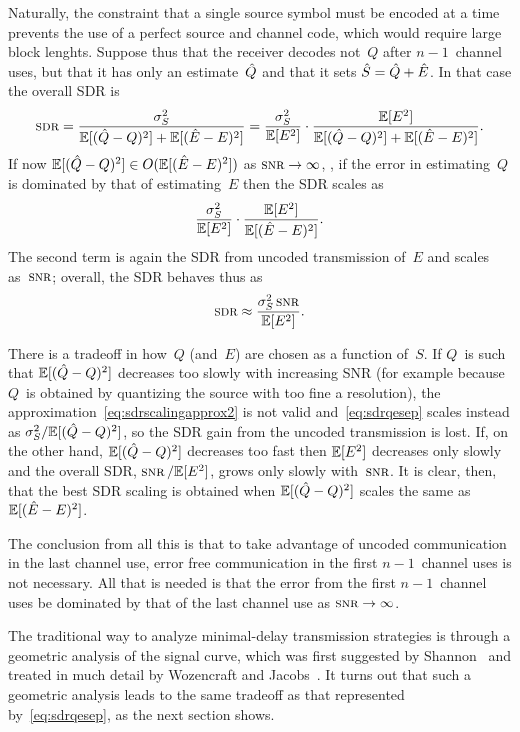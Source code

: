 Naturally, the constraint that a single source symbol must be encoded at a
time prevents the use of a perfect source and channel code, which would require
large block lenghts. Suppose thus that the receiver decodes not~$Q$ after
$n-1$~channel uses, but that it has only an estimate~$\hat{Q}$ and that it sets ${\hat{S}}
= \hat{Q} + \hat{E}$. In that case the overall SDR is
\begin{equation}
  \label{eq:sdrqesep}
  \sdr = \frac{\ssq}{\mseq + \msee} =
  \frac{\ssq}{\E[E^2]} \cdot \frac{\E[E^2]}{\mseq + \E[(\Eh - E)^2]}.
\end{equation}
If now ${\mathbb{E}[(\hat{Q} - Q)^2]} \in O({\mathbb{E}[(\hat{E} - E)^2]})$ as $\snr \goesto \infty$, \ie,
if the error in estimating~$Q$ is dominated by that of estimating~$E$ then
the SDR scales as
\begin{equation}
  \label{eq:sdrscalingapprox}
  \frac{{\sigma_S^2}}{\mathbb{E}[E^2]} \cdot \frac{\mathbb{E}[E^2]}{{\mathbb{E}[(\hat{E} - E)^2]}}.
\end{equation}
The second term is again the SDR from uncoded transmission of~$E$ and scales
as~$\snr$; overall, the SDR behaves thus as
\begin{equation}
  \label{eq:sdrscalingapprox2}
  \sdr \approx \frac{\ssq\snr}{\E[E^2]}.
\end{equation}

There is a tradeoff in how~$Q$ (and~$E$) are chosen as a function of~$S$. If
$Q$~is such that ${\mathbb{E}[(\hat{Q} - Q)^2]}$ decreases too slowly with increasing SNR (for example
because $Q$~is obtained by quantizing the source with too fine a resolution),
the approximation~\eqref{eq:sdrscalingapprox2} is not valid
and~\eqref{eq:sdrqesep} scales instead as ${\sigma_S^2} / {\mathbb{E}[(\hat{Q} - Q)^2]}$, so the SDR gain from
the uncoded transmission is lost.  If, on the other hand, ${\mathbb{E}[(\hat{Q} - Q)^2]}$ decreases too
fast then $\mathbb{E}[E^2]$ decreases only slowly and the overall SDR, $\snr / \E[E^2]$,
grows only slowly with~$\snr$. It is clear, then, that the best SDR scaling is
obtained when ${\mathbb{E}[(\hat{Q} - Q)^2]}$ scales the same as~${\mathbb{E}[(\hat{E} - E)^2]}$.

The conclusion from all this is that to take advantage of uncoded communication
in the last channel use, error free communication in the first $n-1$~channel
uses is not necessary. All that is needed is that the error from the first
$n-1$~channel uses be dominated by that of the last channel use as $\snr \goesto
\infty$. 

The traditional way to analyze minimal-delay transmission strategies is through
a geometric analysis of the signal curve, which was first suggested by
Shannon~\cite{Shannon1949} and treated in much detail by Wozencraft and
Jacobs~\cite{WozencraftJ1965}. It turns out that such a geometric analysis leads
to the same tradeoff as that represented by~\eqref{eq:sdrqesep}, as the next
section shows. 



